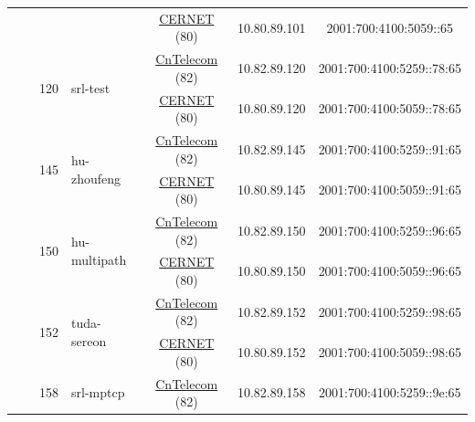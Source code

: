 \begin{small}
\begin{center}
\begin{longtable}{|c|c|c|c|c|c|c|c|}
  &  & \multicolumn{2}{|c|}{} & \multicolumn{2}{|c|}{\tiny{\href{http://www.cernet.edu.cn}{CERNET} (80)}} & \tiny{10.80.89.101} & \tiny{2001:700:4100:5059::65} \\* \cline{3-3}\cline{4-4}\cline{5-5}\cline{6-6}\cline{7-7}\cline{8-8}
  &  & \multirow{2}{*}{\tiny{120}} & \multicolumn{1}{|l|}{\multirow{2}{*}{\tiny{srl-test}}} & \multicolumn{2}{|c|}{\tiny{\href{http://www.chinatelecom.com.cn}{CnTelecom} (82)}} & \tiny{10.82.89.120} & \tiny{2001:700:4100:5259::78:65} \\* \cline{5-5}\cline{6-6}\cline{7-7}\cline{8-8}
  &  &  &  & \multicolumn{2}{|c|}{\tiny{\href{http://www.cernet.edu.cn}{CERNET} (80)}} & \tiny{10.80.89.120} & \tiny{2001:700:4100:5059::78:65} \\* \cline{3-3}\cline{4-4}\cline{5-5}\cline{6-6}\cline{7-7}\cline{8-8}
  &  & \multirow{2}{*}{\tiny{145}} & \multicolumn{1}{|l|}{\multirow{2}{*}{\tiny{hu-zhoufeng}}} & \multicolumn{2}{|c|}{\tiny{\href{http://www.chinatelecom.com.cn}{CnTelecom} (82)}} & \tiny{10.82.89.145} & \tiny{2001:700:4100:5259::91:65} \\* \cline{5-5}\cline{6-6}\cline{7-7}\cline{8-8}
  &  &  &  & \multicolumn{2}{|c|}{\tiny{\href{http://www.cernet.edu.cn}{CERNET} (80)}} & \tiny{10.80.89.145} & \tiny{2001:700:4100:5059::91:65} \\* \cline{3-3}\cline{4-4}\cline{5-5}\cline{6-6}\cline{7-7}\cline{8-8}
  &  & \multirow{2}{*}{\tiny{150}} & \multicolumn{1}{|l|}{\multirow{2}{*}{\tiny{hu-multipath}}} & \multicolumn{2}{|c|}{\tiny{\href{http://www.chinatelecom.com.cn}{CnTelecom} (82)}} & \tiny{10.82.89.150} & \tiny{2001:700:4100:5259::96:65} \\* \cline{5-5}\cline{6-6}\cline{7-7}\cline{8-8}
  &  &  &  & \multicolumn{2}{|c|}{\tiny{\href{http://www.cernet.edu.cn}{CERNET} (80)}} & \tiny{10.80.89.150} & \tiny{2001:700:4100:5059::96:65} \\* \cline{3-3}\cline{4-4}\cline{5-5}\cline{6-6}\cline{7-7}\cline{8-8}
  &  & \multirow{2}{*}{\tiny{152}} & \multicolumn{1}{|l|}{\multirow{2}{*}{\tiny{tuda-sereon}}} & \multicolumn{2}{|c|}{\tiny{\href{http://www.chinatelecom.com.cn}{CnTelecom} (82)}} & \tiny{10.82.89.152} & \tiny{2001:700:4100:5259::98:65} \\* \cline{5-5}\cline{6-6}\cline{7-7}\cline{8-8}
  &  &  &  & \multicolumn{2}{|c|}{\tiny{\href{http://www.cernet.edu.cn}{CERNET} (80)}} & \tiny{10.80.89.152} & \tiny{2001:700:4100:5059::98:65} \\* \cline{3-3}\cline{4-4}\cline{5-5}\cline{6-6}\cline{7-7}\cline{8-8}
  &  & \multirow{2}{*}{\tiny{158}} & \multicolumn{1}{|l|}{\multirow{2}{*}{\tiny{srl-mptcp}}} & \multicolumn{2}{|c|}{\tiny{\href{http://www.chinatelecom.com.cn}{CnTelecom} (82)}} & \tiny{10.82.89.158} & \tiny{2001:700:4100:5259::9e:65} \\* \cline{5-5}\cline{6-6}\cline{7-7}\cline{8-8}

\end{longtable}
\end{center}
\end{small}
